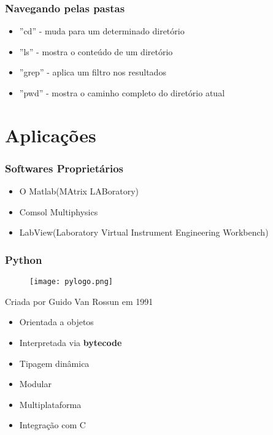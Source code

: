 \documentclass{beamer}
\begin{document}
\begin{frame}
    \frametitle{Navegando pelas pastas}

    \begin{itemize}
        \item ''cd'' - muda para um determinado diretório
        \item ''ls'' - mostra o conteúdo de um diretório
        \item ''grep'' - aplica um filtro nos resultados
        \item ''pwd'' - mostra o caminho completo do diretório atual
    \end{itemize}
\end{frame}


\section{Aplicações}

\begin{frame}

    \frametitle{Softwares Proprietários}
    \begin{itemize}
    \item O Matlab(MAtrix LABoratory)
    \item Comsol Multiphysics
    \item LabView(Laboratory Virtual Instrument Engineering Workbench)
    \end{itemize}
\end{frame}

\begin{frame}
    \frametitle{Python}
    \begin{figure}
        \texttt{[image: pylogo.png]}
    \end{figure}   
    Criada por Guido Van Rossun em 1991
    \begin{itemize}
        \item Orientada a objetos
        \item Interpretada via \textbf{bytecode}
        \item Tipagem dinâmica
        \item Modular
        \item Multiplataforma
        \item Integração com C
    \end{itemize}
\end{frame}
\end{document}
